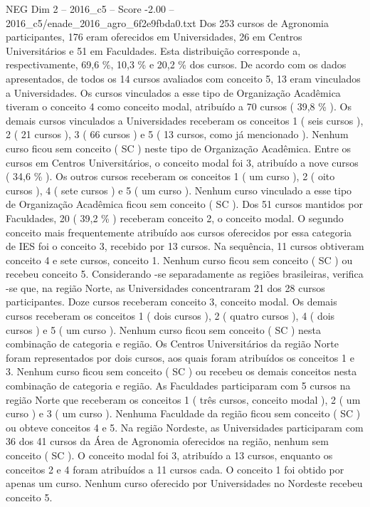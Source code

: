 \begin{textsample}{NEG Dim 2 – 2016\_c5 – Score -2.00 – 2016\_c5/enade\_2016\_agro\_6f2e9fbda0.txt}
Dos 253 cursos de Agronomia participantes, 176 eram oferecidos em Universidades, 26 em Centros Universitários e 51 em Faculdades.
Esta distribuição corresponde a, respectivamente, 69,6 \%, 10,3 \% e 20,2 \% dos cursos.
De acordo com os dados apresentados, de todos os 14 cursos avaliados com conceito 5, 13 eram vinculados a Universidades.
Os cursos vinculados a esse tipo de Organização Acadêmica tiveram o conceito 4 como conceito modal, atribuído a 70 cursos ( 39,8 \% ).
Os demais cursos vinculados a Universidades receberam os conceitos 1 ( seis cursos ), 2 ( 21 cursos ), 3 ( 66 cursos ) e 5 ( 13 cursos, como já mencionado ).
Nenhum curso ficou sem conceito ( SC ) neste tipo de Organização Acadêmica.
Entre os cursos em Centros Universitários, o conceito modal foi 3, atribuído a nove cursos ( 34,6 \% ).
Os outros cursos receberam os conceitos 1 ( um curso ), 2 ( oito cursos ), 4 ( sete cursos ) e 5 ( um curso ).
Nenhum curso vinculado a esse tipo de Organização Acadêmica ficou sem conceito ( SC ).
Dos 51 cursos mantidos por Faculdades, 20 ( 39,2 \% ) receberam conceito 2, o conceito modal.
O segundo conceito mais frequentemente atribuído aos cursos oferecidos por essa categoria de IES foi o conceito 3, recebido por 13 cursos.
Na sequência, 11 cursos obtiveram conceito 4 e sete cursos, conceito 1.
Nenhum curso ficou sem conceito ( SC ) ou recebeu conceito 5.
Considerando -se separadamente as regiões brasileiras, verifica -se que, na região Norte, as Universidades concentraram 21 dos 28 cursos participantes.
Doze cursos receberam conceito 3, conceito modal.
Os demais cursos receberam os conceitos 1 ( dois cursos ), 2 ( quatro cursos ), 4 ( dois cursos ) e 5 ( um curso ).
Nenhum curso ficou sem conceito ( SC ) nesta combinação de categoria e região.
Os Centros Universitários da região Norte foram representados por dois cursos, aos quais foram atribuídos os conceitos 1 e 3.
Nenhum curso ficou sem conceito ( SC ) ou recebeu os demais conceitos nesta combinação de categoria e região.
As Faculdades participaram com 5 cursos na região Norte que receberam os conceitos 1 ( três cursos, conceito modal ), 2 ( um curso ) e 3 ( um curso ).
Nenhuma Faculdade da região ficou sem conceito ( SC ) ou obteve conceitos 4 e 5.
Na região Nordeste, as Universidades participaram com 36 dos 41 cursos da Área de Agronomia oferecidos na região, nenhum sem conceito ( SC ).
O conceito modal foi 3, atribuído a 13 cursos, enquanto os conceitos 2 e 4 foram atribuídos a 11 cursos cada.
O conceito 1 foi obtido por apenas um curso.
Nenhum curso oferecido por Universidades no Nordeste recebeu conceito 5.

\end{textsample}
